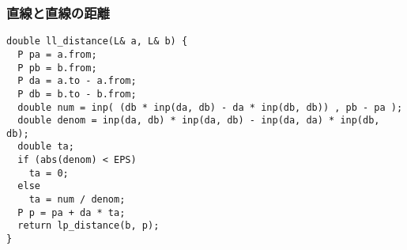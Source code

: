 \subsubsection{直線と直線の距離}

\begin{lstlisting}
double ll_distance(L& a, L& b) {
  P pa = a.from;
  P pb = b.from;
  P da = a.to - a.from;
  P db = b.to - b.from;
  double num = inp( (db * inp(da, db) - da * inp(db, db)) , pb - pa );
  double denom = inp(da, db) * inp(da, db) - inp(da, da) * inp(db, db);
  double ta;
  if (abs(denom) < EPS)
    ta = 0;
  else
    ta = num / denom;
  P p = pa + da * ta;
  return lp_distance(b, p);
}
\end{lstlisting}

\newpage

